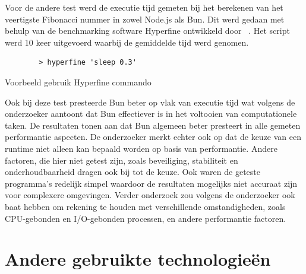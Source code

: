 Voor de andere test werd de executie tijd gemeten bij het berekenen van het veertigste Fibonacci nummer in zowel Node.js als Bun. 
Dit werd gedaan met behulp van de benchmarking software Hyperfine ontwikkeld door ~\textcite{Pompeii2024}. 
Het script werd 10 keer uitgevoerd waarbij de gemiddelde tijd werd genomen.
\begin{listing}[H]
    \centering
    \begin{verbatim}
        > hyperfine 'sleep 0.3'
        \end{verbatim}
        \caption[Gebruik Hyperfine]{Voorbeeld gebruik Hyperfine commando \autocite{Pompeii2024}}
\end{listing}
Ook bij deze test presteerde Bun beter op vlak van executie tijd wat volgens de onderzoeker aantoont dat Bun effectiever is in het voltooien van computationele taken.
De resultaten tonen aan dat 
Bun algemeen beter presteert in alle gemeten performantie aspecten.
De onderzoeker merkt echter ook op dat de keuze van een runtime niet alleen kan bepaald worden op basis van 
performantie. Andere factoren, die hier niet getest zijn, zoals beveiliging, stabiliteit en onderhoudbaarheid dragen ook bij tot de keuze. 
Ook waren de geteste programma's redelijk simpel waardoor de resultaten mogelijks niet accuraat zijn voor complexere omgevingen. 
Verder onderzoek zou volgens de onderzoeker ook baat hebben om rekening te houden met verschillende omstandigheden, zoals CPU-gebonden
en I/O-gebonden processen, en andere performantie factoren.

\section{Andere gebruikte technologieën}
